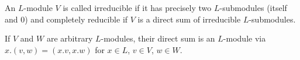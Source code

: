 An $L$-module $V$ is called irreducible if it has precisely two $L$-submodules (itself and $0$) and completely reducible if $V$ is a direct sum of irreducible $L$-submodules.

If $V$ and $W$ are arbitrary $L$-modules, their direct sum is an $L$-module via $x.(v, w) = (x.v, x.w)$ for $x \in L$, $v \in V$, $w \in W$.
